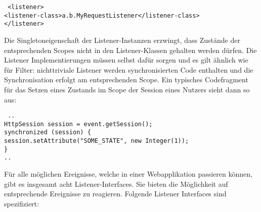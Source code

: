 \documentclass[a4paper,10pt]{scrreprt}
\begin{document}
\begin{verbatim}
 <listener>
<listener-class>a.b.MyRequestListener</listener-class>
</listener>
\end{verbatim}

Die Singletoneigenschaft der Listener-Instanzen erzwingt, dass Zustände der entsprechenden
Scopes nicht in den Listener-Klassen gehalten werden dürfen. Die Listener Implementierungen
müssen selbst dafür sorgen und es gilt ähnlich wie für Filter: nichttriviale Listener werden
synchronisierten Code enthalten und die Synchronisation erfolgt am entsprechenden Scope. Ein
typisches Codefragment für das Setzen eines Zustands im Scope der Session eines Nutzers sieht
dann so aus:

\begin{verbatim}
 ..
HttpSession session = event.getSession();
synchronized (session) {
session.setAttribute("SOME_STATE", new Integer(1));
}
..
\end{verbatim}

Für alle möglichen Ereignisse, welche in einer Webapplikation passieren können, gibt es insgesamt
acht Listener-Interfaces. Sie bieten die Möglichkeit auf entsprechende Ereignisse zu reagieren.
Folgende Listener Interfaces sind spezifiziert:
\end{document}
